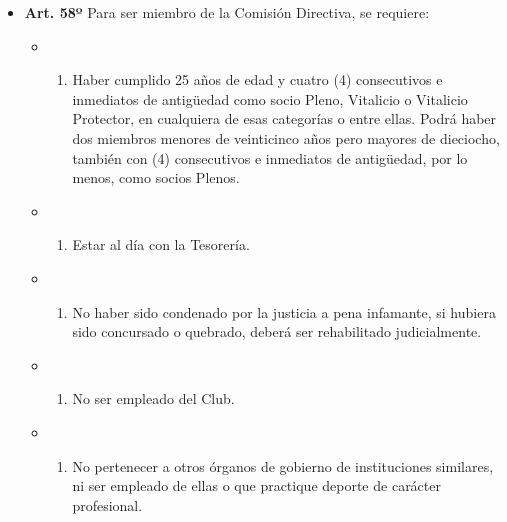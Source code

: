 \documentclass[openany]{book}
\providecommand{\tightlist}{%
  \setlength{\itemsep}{0pt}\setlength{\parskip}{0pt}}
\begin{document}
\begin{itemize}
\tightlist
\item
  \textbf{Art. 58º}
  Para ser miembro de la Comisión Directiva, se requiere:

  \begin{itemize}
  \item
    \begin{enumerate}
    \def\labelenumi{\alph{enumi})}
    \tightlist
    \item
      Haber cumplido 25 años de edad y cuatro (4) consecutivos e inmediatos de antigüedad como socio Pleno, Vitalicio o Vitalicio Protector, en cualquiera de esas categorías o entre ellas. Podrá haber dos miembros menores de veinticinco años pero mayores de dieciocho, también con (4) consecutivos e inmediatos de antigüedad, por lo menos, como socios Plenos.
    \end{enumerate}
  \item
    \begin{enumerate}
    \def\labelenumi{\alph{enumi})}
    \setcounter{enumi}{1}
    \tightlist
    \item
      Estar al día con la Tesorería.
    \end{enumerate}
  \item
    \begin{enumerate}
    \def\labelenumi{\alph{enumi})}
    \setcounter{enumi}{2}
    \tightlist
    \item
      No haber sido condenado por la justicia a pena infamante, si hubiera sido concursado o quebrado, deberá ser rehabilitado judicialmente.
    \end{enumerate}
  \item
    \begin{enumerate}
    \def\labelenumi{\alph{enumi})}
    \setcounter{enumi}{3}
    \tightlist
    \item
      No ser empleado del Club.
    \end{enumerate}
  \item
    \begin{enumerate}
    \def\labelenumi{\alph{enumi})}
    \setcounter{enumi}{4}
    \tightlist
    \item
      No pertenecer a otros órganos de gobierno de instituciones similares, ni ser empleado de ellas o que practique deporte de carácter profesional.
    \end{enumerate}
  \end{itemize}
\end{itemize}
\end{document}
